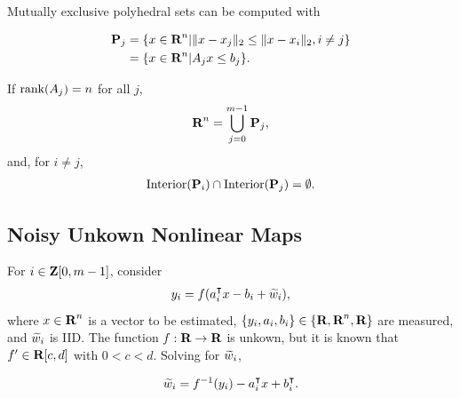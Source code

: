 \documentclass{article}
\begin{document}
    Mutually exclusive polyhedral sets can be computed with

    \begin{align*}
        \textbf{P}_j&=\{x\in\textbf{R}^n| \|x-x_j\|_2\leq\|x-x_i\|_2, i\neq j  \}\\
        &=\{x\in\textbf{R}^n|A_jx\leq b_j\}.
    \end{align*}

    If $\text{rank}(A_j)=n$ for all $j$,
    \begin{align*}
        \textbf{R}^n=\bigcup_{j=0}^{m-1} \textbf{P}_j,
    \end{align*}
    and, for $i\neq j$,
    \begin{align*}
        \text{Interior}(\textbf{P}_i)\cap\text{Interior}(\textbf{P}_j)=\emptyset.
    \end{align*}



\subsection{Noisy Unkown Nonlinear Maps}

    For $i\in\textbf{Z}[0,m-1]$, consider
    \begin{align*}
        y_i = f(a_i^\intercal x-b_i + \widetilde{w}_i),
    \end{align*}
    where $x\in\textbf{R}^n$ is a vector to be estimated,
    $\{y_i,a_i,b_i\}\in\{\textbf{R},\textbf{R}^n,\textbf{R}\}$ are measured,
    and $\widetilde{w}_i$ is IID.
    The function $f:\textbf{R}\to\textbf{R}$ is unkown, but it is known that
    $f'\in\textbf{R}[c,d]$ with $0<c<d$. Solving for $\widetilde{w}_i$,

    \begin{align*}
        \widetilde{w}_i = f^{-1}(y_i) - a_i^\intercal x + b_i^\intercal.
    \end{align*}
\end{document}
